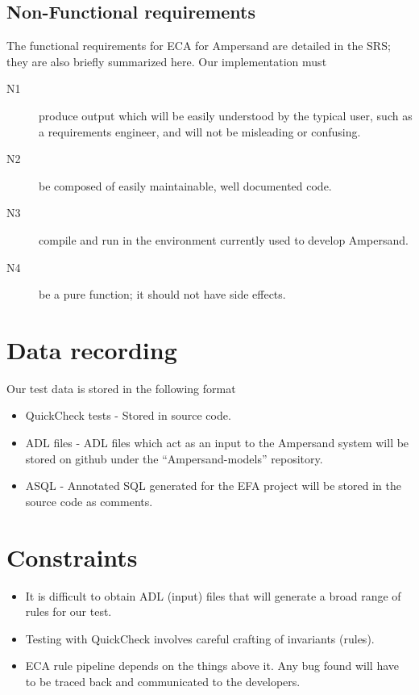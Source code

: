 \documentclass[12pt]{report}
\begin{document}
\subsection{Non-Functional requirements}\label{subsec:NonFunReqs}
The functional
requirements for ECA for Ampersand are detailed in the SRS; they
are also briefly summarized here. Our implementation must

\begin{description}
\item[N1] produce output which will be easily understood by the typical user,
  such as a requirements engineer, and will not be misleading or confusing.  
\item[N2] be composed of easily maintainable, well documented code.
\item[N3] compile and run in the environment currently used to develop
  Ampersand.
\item[N4] be a pure function; it should not have side effects.  
\end{description}

\section{Data recording}\label{sec:DataRec}
Our test data is stored in the following format
\begin{itemize}
\item QuickCheck tests - Stored in source code.
\item ADL files - ADL files which act as an input to the Ampersand system will be stored on github under the ``Ampersand-models'' repository.        
\item ASQL - Annotated SQL generated for the EFA project will be stored in the source code as comments.
\end{itemize}
\section{Constraints}\label{sec:Constraints}
\begin{itemize}
\item It is difficult to obtain ADL (input) files that will generate a broad range of rules for our test.  
\item Testing with QuickCheck involves careful crafting of invariants (rules).        
\item ECA rule pipeline depends on the things above it. Any bug found will have to be traced back and communicated to the developers.
\end{itemize}
\end{document}
